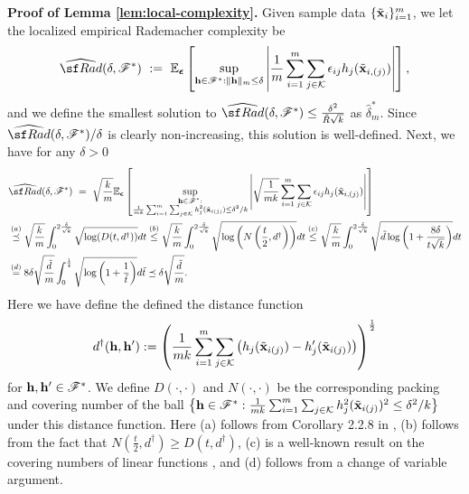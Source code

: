 {    \noindent \textbf{Proof of Lemma \ref{lem:local-complexity}.}
    Given sample data $\{\tilde{\mathbf{x}}_i\}_{i=1}^{m}$, we let the localized empirical Rademacher complexity be 
        $$
    \widehat{\sf Rad}(\delta, \Fscr^*) ~:=~ \E_{\epsvec}\left[
    \sup_{\hvec \in \Fscr^*: \lVert \hvec\rVert_{m}\leq \delta}\left|
    \frac{1}{m}\sum_{i=1}^m\sum_{j \in \Kscr}\epsilon_{ij}h_j(\tilde{\x}_{i,(j)})
    \right|
    \right], 
    $$
    and we define the smallest solution to $\widehat{\sf Rad}(\delta, \Fscr^*) \leq \frac{\delta^2}{\tilde{R}\sqrt{k}}$ as $\hat{\delta}^*_m$. Since $\widehat{\sf Rad}(\delta, \Fscr^*)/\delta$ is clearly non-increasing, this solution is well-defined. 
    Next, we have for any $\delta > 0$
    \begin{align}
    \label{eqn:empirical-rade}
        & \widehat{\sf Rad}(\delta, \Fscr^*) ~=~ \sqrt{\frac{k}{m}}\E_{\epsvec}\left[
    \sup_{\substack{\hvec \in \Fscr^*:\\ 
    \frac{1}{mk}\sum_{i=1}^m\sum_{j \in \Kscr}h^2_j(\tilde{\x}_{i(j)})
    \leq \delta^2/k
    }}\left|
    \sqrt{\frac{1}{mk}}\sum_{i=1}^m\sum_{j \in \Kscr}\epsilon_{ij}h_j(\tilde{\x}_{i,(j)})
    \right|
    \right]\\
    &\stackrel{(a)}{\preceq }
    \sqrt{\frac{k}{m}} \int_0^{2\frac{\delta}{\sqrt{k}}}\sqrt{\log(D(t, d^{\dag}))}dt \stackrel{(b)}{\leq} 
    \sqrt{\frac{k}{m}} \int_0^{2\frac{\delta}{\sqrt{k}}}\sqrt{\log\left(N\left(\frac{t}{2}, d^{\dag}\right)\right)}dt \stackrel{(c)}{\leq} 
    \sqrt{\frac{k}{m}} \int_0^{2\frac{\delta}{\sqrt{k}}}\sqrt{\tilde{d}\log\left(1 + \frac{8\delta}{t\sqrt{k}}\right)}dt \\
    &\stackrel{(d)}{=} 8\delta\sqrt{\frac{\tilde{d}}{m}}\int_0^{\frac{1}{4}}\sqrt{\log\left(1 + \frac{1}{\tilde{t}}\right)}d\tilde{t} \preceq \delta\sqrt{\frac{\tilde{d}}{m}}.
    \end{align}
    Here we have define the defined the distance function $$d^{\dag}(\mathbf{h}, \mathbf{h}') := \left(
    \frac{1}{mk}\sum_{i=1}^m\sum_{j \in \mathcal{K}}\left(h_j(\tilde{\mathbf{x}}_{i(j)}) - h'_j(\tilde{\mathbf{x}}_{i(j)}) \right)
    \right)^{\frac{1}{2}}$$
    for $\mathbf{h}, \mathbf{h}' \in \mathscr{F}^*$. We define $D(\cdot, \cdot)$ and $N(\cdot, \cdot)$ be the corresponding packing and covering number of the ball $\big\{\mathbf{h} \in \mathscr{F}^*: \frac{1}{mk}\sum_{i=1}^m\sum_{j \in \mathcal{K}}h^2_j(\tilde{\mathbf{x}}_{i(j)})^2
    \leq \delta^2/k\big\}$ under this distance function. 
    Here (a) follows from Corollary 2.2.8 in \cite{vaart2023empirical}, (b) follows from the fact that $N\left(\frac{t}{2}, d^{\dag}\right) \geq D\left({t}, d^{\dag}\right)$, (c) is a well-known result on the covering numbers of linear functions \cite[e.g., see Example 13.8][]{wainwright1945high}, and (d) follows from a change of variable argument. 

}
